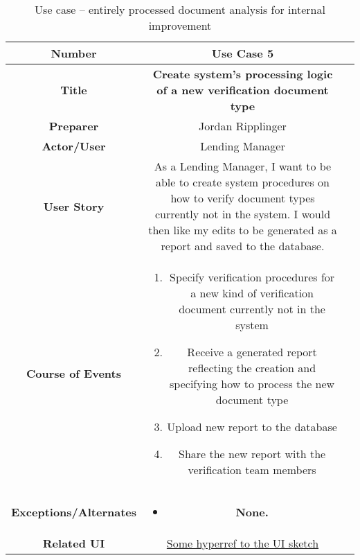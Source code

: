 \begin{table}[H]
    \centering
    \begin{tabularx}{0.75\linewidth}{||Sc|X||}
        \hline
        \hline
        \textbf{Number} & \textbf{Use Case 5} \\
        \hline
        \textbf{Title} & \textbf{Create system's processing logic of a new verification document type}\\
        \hline
        \textbf{Preparer} & Jordan Ripplinger \\
        \hline
        \textbf{Actor/User} & Lending Manager \\
        \hline
        \textbf{User Story} &
        As a Lending Manager, I want to be able to create system procedures on how to verify document types currently not in the system. I would then like my edits to be generated as a report and saved to the database. \\
        \hline
        \textbf{Course of Events} &
        \begin{minipage}[l]{\linewidth}
            \begin{enumerate}[wide, labelindent=0pt]
                \item Specify verification procedures for a new kind of verification document currently not in the system
                \item Receive a generated report reflecting the creation and specifying how to process the new document type
                \item Upload new report to the database
                \item Share the new report with the verification team members
            \end{enumerate}
            \vspace{4pt}
        \end{minipage} \\
        \hline
        \textbf{Exceptions/Alternates} & 
        \begin{minipage}[l]{\linewidth}
            \vspace{2pt}
            \begin{itemize}[wide, labelindent=0pt]
                \item \textbf{None.}
            \end{itemize}
        \end{minipage} \\
        \hline
        \textbf{Related UI} & \hyperref[templatesec]{Some hyperref to the UI sketch} \\
        \hline
        \hline
    \end{tabularx}
    \caption{Use case -- entirely processed document analysis for internal improvement}
    \label{tab:use_case_internal}
\end{table}

